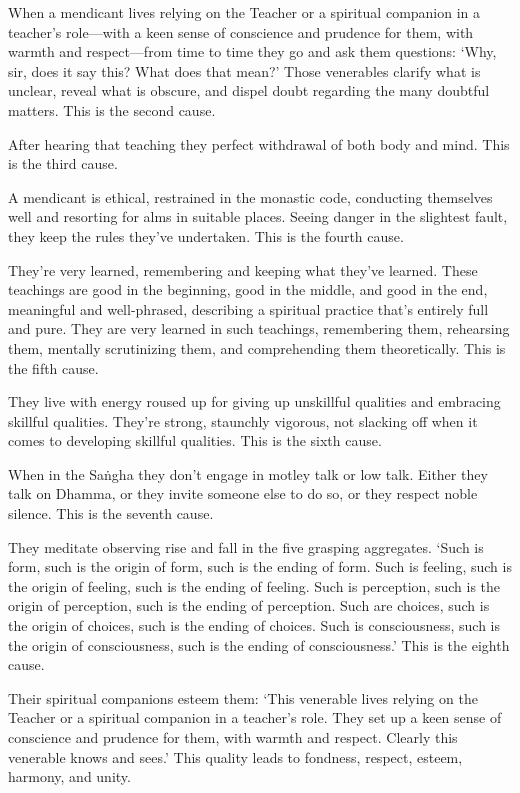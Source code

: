 \documentclass[12pt,openany]{book}%
\begin{document}
When a mendicant lives relying on the Teacher or a spiritual companion in a teacher’s role—with a keen sense of conscience and prudence for them, with warmth and respect—from time to time they go and ask them questions: ‘Why, sir, does it say this? What does that mean?’ Those venerables clarify what is unclear, reveal what is obscure, and dispel doubt regarding the many doubtful matters. This is the second cause. 

After hearing that teaching they perfect withdrawal of both body and mind. This is the third cause. 

A mendicant is ethical, restrained in the monastic code, conducting themselves well and resorting for alms in suitable places. Seeing danger in the slightest fault, they keep the rules they’ve undertaken. This is the fourth cause. 

They’re very learned, remembering and keeping what they’ve learned. These teachings are good in the beginning, good in the middle, and good in the end, meaningful and well-phrased, describing a spiritual practice that’s entirely full and pure. They are very learned in such teachings, remembering them, rehearsing them, mentally scrutinizing them, and comprehending them theoretically. This is the fifth cause. 

They live with energy roused up for giving up unskillful qualities and embracing skillful qualities. They’re strong, staunchly vigorous, not slacking off when it comes to developing skillful qualities. This is the sixth cause. 

When in the \textsanskrit{Saṅgha} they don’t engage in motley talk or low talk. Either they talk on Dhamma, or they invite someone else to do so, or they respect noble silence. This is the seventh cause. 

They meditate observing rise and fall in the five grasping aggregates. ‘Such is form, such is the origin of form, such is the ending of form. Such is feeling, such is the origin of feeling, such is the ending of feeling. Such is perception, such is the origin of perception, such is the ending of perception. Such are choices, such is the origin of choices, such is the ending of choices. Such is consciousness, such is the origin of consciousness, such is the ending of consciousness.’ This is the eighth cause. 

Their spiritual companions esteem them: ‘This venerable lives relying on the Teacher or a spiritual companion in a teacher’s role. They set up a keen sense of conscience and prudence for them, with warmth and respect. Clearly this venerable knows and sees.’ This quality leads to fondness, respect, esteem, harmony, and unity. 
\end{document}
